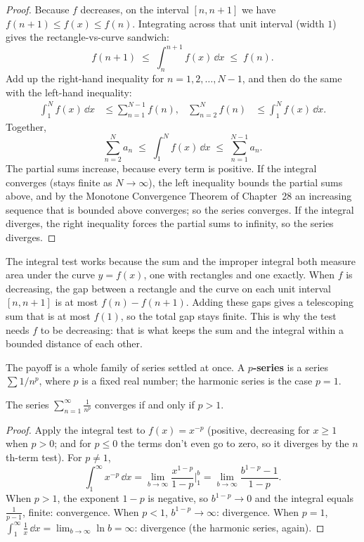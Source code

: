 \begin{proof}
Because $f$ decreases, on the interval $[n, n+1]$ we have $f(n+1) \le f(x) \le f(n)$. Integrating across that unit interval (width $1$) gives the rectangle-vs-curve sandwich:
\[
f(n+1) \;\le\; \int_{n}^{n+1} f(x)\,\dd x \;\le\; f(n).
\]
Add up the right-hand inequality for $n=1, 2, \dots, N-1$, and then do the same with the left-hand inequality:
\begin{align*}
\int_1^{N} f(x)\,\dd x &\le \sum_{n=1}^{N-1} f(n), &
\sum_{n=2}^{N} f(n) &\le \int_1^{N} f(x)\,\dd x.
\end{align*}
Together,
\[
\sum_{n=2}^{N} a_n \;\le\; \int_1^{N} f(x)\,\dd x \;\le\; \sum_{n=1}^{N-1} a_n .
\]
The partial sums increase, because every term is positive. If the integral converges (stays finite as $N\to\infty$), the left inequality bounds the partial sums above, and by the Monotone Convergence Theorem of Chapter~28 an increasing sequence that is bounded above converges; so the series converges. If the integral diverges, the right inequality forces the partial sums to infinity, so the series diverges.
\end{proof}

\begin{whybox}
The integral test works because the sum and the improper integral both measure area under the curve $y = f(x)$, one with rectangles and one exactly. When $f$ is decreasing, the gap between a rectangle and the curve on each unit interval $[n, n+1]$ is at most $f(n) - f(n+1)$. Adding these gaps gives a telescoping sum that is at most $f(1)$, so the total gap stays finite. This is why the test needs $f$ to be decreasing: that is what keeps the sum and the integral within a bounded distance of each other.
\end{whybox}

The payoff is a whole family of series settled at once. A \textbf{$p$-series} is a series $\sum 1/n^p$, where $p$ is a fixed real number; the harmonic series is the case $p=1$.

\begin{theorem}
\label{ch29:thm-pseries}
The series $\displaystyle\sum_{n=1}^{\infty} \frac{1}{n^p}$ converges if and only if $p > 1$.
\end{theorem}

\begin{proof}
Apply the integral test to $f(x)=x^{-p}$ (positive, decreasing for $x\ge 1$ when $p>0$; and for $p\le 0$ the terms don't even go to zero, so it diverges by the $n$th-term test). For $p \ne 1$,
\[
\int_1^{\infty} x^{-p}\,\dd x = \lim_{b\to\infty} \frac{x^{1-p}}{1-p}\Big|_1^{b} = \lim_{b\to\infty}\frac{b^{1-p}-1}{1-p}.
\]
When $p>1$, the exponent $1-p$ is negative, so $b^{1-p}\to 0$ and the integral equals $\tfrac{1}{p-1}$, finite: convergence. When $p<1$, $b^{1-p}\to\infty$: divergence. When $p=1$, $\int_1^\infty \tfrac1x\,\dd x = \lim_{b\to\infty}\ln b = \infty$: divergence (the harmonic series, again).
\end{proof}

